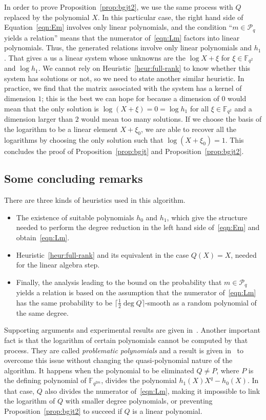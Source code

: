 \documentclass[a4paper,11pt]{article}
\theoremstyle{break}
\theoremstyle{sc}
\theoremstyle{definition}
\theoremstyle{remark}
\begin{document}
In order to prove Proposition~\ref{prop:bgjt2}, we use the same process with $Q$ replaced by the
polynomial $X$. In this particular case, the right hand side of
Equation~\eqref{eqn:Em} involves only linear polynomials, and the condition
``$m\in\mathcal P_q$ yields a relation'' means that the numerator
of~\eqref{eqn:Lm} factors into linear polynomials. Thus, the generated relations
involve only linear polynomials and $h_1$. That gives a us a linear system whose
unknowns are the $\log X+\xi$ for $\xi\in\mathbb{F}_{q^2}$ and $\log h_1$. We
cannot rely on Heuristic~\ref{heur:full-rank} to know whether this system has
solutions or not, so we need to state another similar heuristic. In practice, we find that the
matrix associated with the system has a kernel of dimension $1$; this is the
best we can hope for because a dimension of $0$ would mean that the only solution is
$\log (X+\xi)=0=\log h_1$ for all $\xi\in\mathbb{F}_{q^2}$ and a dimension larger
than $2$ would mean too many solutions. If we choose the basis of the logarithm
to be a linear element $X+\xi_0$, we are able to recover all the logarithms by
choosing the only solution such that $\log (X+\xi_0)=1$. This concludes the proof
of Proposition~\ref{prop:bgjt} and Proposition~\ref{prop:bgjt2}.

\subsection{Some concluding remarks}

There are three kinds of heuristics used in this algorithm.
\begin{itemize}
  \item The existence of suitable polynomials $h_0$ and $h_1$, which give the
    structure needed to perform the degree reduction in the left hand side
    of~\eqref{eqn:Em} and obtain~\eqref{eqn:Lm}.
  \item Heuristic~\ref{heur:full-rank} and its equivalent in the case
    $Q(X) = X$, needed for the linear algebra step.
  \item Finally, the analysis leading to the bound on the probability that
    $m\in\mathcal P_q$ yields a relation is based on the assumption that the
    numerator of~\eqref{eqn:Lm} has the same probability to be
    $\lceil\frac{1}{2}\deg Q\rceil$-smooth as a random polynomial of the same
    degree.
\end{itemize}
Supporting arguments and experimental results are given in~\cite{BGJT13}. 
Another important fact is that the logarithm of certain polynomials cannot
be computed by that process. They are called \emph{problematic polynomials} and
a result is given in~\cite{BGJT13} to overcome this issue without changing the
quasi-polynomial nature of the algorithm. It happens when the polynomial to be
eliminated $Q\neq P$, where $P$ is the defining polynomial of
$\mathbb{F}_{q^{2m}}$, divides the polynomial $h_1(X)X^q-h_0(X)$. In that case,
$Q$ also divides the numerator of~\eqref{eqn:Lm}, making it impossible to link
the logarithm of $Q$ with smaller degree polynomials, or preventing 
Proposition~\ref{prop:bgjt2} to succeed if $Q$ is a linear polynomial.
\end{document}
